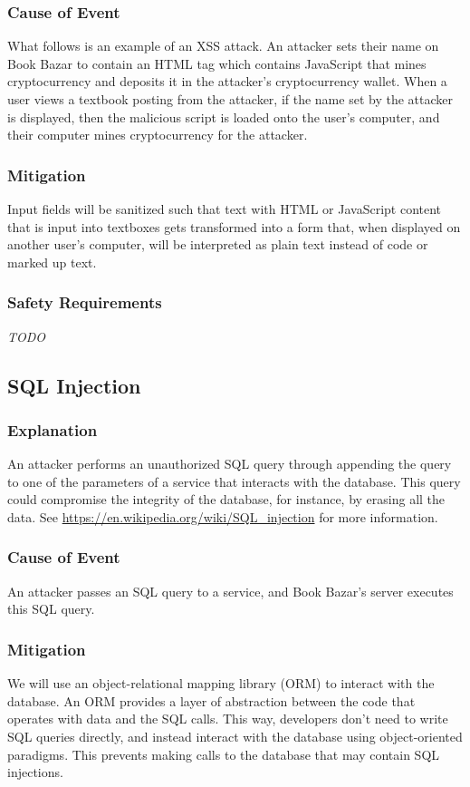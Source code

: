 \documentclass[fullpage]{article}
\begin{document}
\subsubsection*{Cause of Event}
What follows is an example of an XSS attack. An attacker sets their name on Book Bazar to contain an HTML tag which contains JavaScript that mines cryptocurrency and deposits it in the attacker’s cryptocurrency wallet. When a user views a textbook posting from the attacker, if the name set by the attacker is displayed, then the malicious script is loaded onto the user’s computer, and their computer mines cryptocurrency for the attacker.

\subsubsection*{Mitigation}
Input fields will be sanitized such that text with HTML or JavaScript content that is input into textboxes gets transformed into a form that, when displayed on another user's computer, will be interpreted as plain text instead of code or marked up text.

\subsubsection*{Safety Requirements}
\emph{TODO}

\subsection{SQL Injection}

\subsubsection*{Explanation}
An attacker performs an unauthorized SQL query through appending the query to one of the parameters of a service that interacts with the database. This query could compromise the integrity of the database, for instance, by erasing all the data. See \url{https://en.wikipedia.org/wiki/SQL_injection} for more information.

\subsubsection*{Cause of Event}
An attacker passes an SQL query to a service, and Book Bazar’s server executes this SQL query.

\subsubsection*{Mitigation}
We will use an object-relational mapping library (ORM) to interact with the database. An ORM provides a layer of abstraction between the code that operates with data and the SQL calls. This way, developers don’t need to write SQL queries directly, and instead interact with the database using object-oriented paradigms. This prevents making calls to the database that may contain SQL injections.
\end{document}
